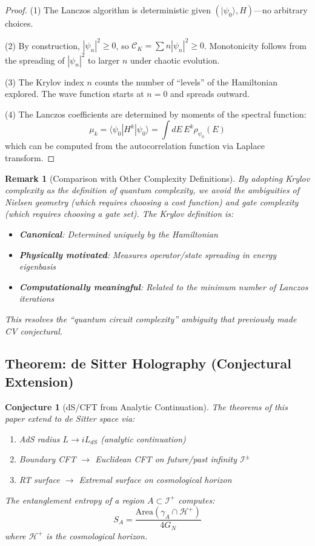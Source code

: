 \documentclass[12pt,a4paper]{article}
\newtheorem{conjecture}[theorem]{Conjecture}
\newtheorem*{remark}{Remark}
\begin{document}
\begin{proof}
(1) The Lanczos algorithm is deterministic given $(|\psi_0\rangle, H)$---no arbitrary choices.

(2) By construction, $|\psi_n|^2 \geq 0$, so $\mathcal{C}_K = \sum n|\psi_n|^2 \geq 0$. Monotonicity follows from the spreading of $|\psi_n|^2$ to larger $n$ under chaotic evolution.

(3) The Krylov index $n$ counts the number of ``levels'' of the Hamiltonian explored. The wave function starts at $n=0$ and spreads outward.

(4) The Lanczos coefficients are determined by moments of the spectral function:
\begin{equation}
\mu_k = \langle\psi_0|H^k|\psi_0\rangle = \int dE \, E^k \rho_{\psi_0}(E)
\end{equation}
which can be computed from the autocorrelation function via Laplace transform.
\end{proof}

\begin{remark}[Comparison with Other Complexity Definitions]
By adopting Krylov complexity as \textit{the} definition of quantum complexity, we avoid the ambiguities of Nielsen geometry (which requires choosing a cost function) and gate complexity (which requires choosing a gate set). The Krylov definition is:
\begin{itemize}
    \item \textbf{Canonical}: Determined uniquely by the Hamiltonian
    \item \textbf{Physically motivated}: Measures operator/state spreading in energy eigenbasis
    \item \textbf{Computationally meaningful}: Related to the minimum number of Lanczos iterations
\end{itemize}

This resolves the ``quantum circuit complexity'' ambiguity that previously made CV conjectural.
\end{remark}

\subsection{Theorem: de Sitter Holography (Conjectural Extension)}

\begin{conjecture}[dS/CFT from Analytic Continuation]\label{conj:ds-cft}
The theorems of this paper extend to de Sitter space via:
\begin{enumerate}
    \item AdS radius $L \to i L_{dS}$ (analytic continuation)
    \item Boundary CFT $\to$ Euclidean CFT on future/past infinity $\mathcal{I}^\pm$
    \item RT surface $\to$ Extremal surface on cosmological horizon
\end{enumerate}
The entanglement entropy of a region $A \subset \mathcal{I}^+$ computes:
\begin{equation}
S_A = \frac{\text{Area}(\gamma_A \cap \mathcal{H}^+)}{4G_N}
\end{equation}
where $\mathcal{H}^+$ is the cosmological horizon.
\end{conjecture}
\end{document}
